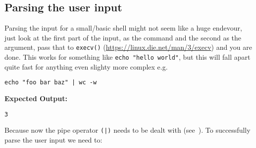 \documentclass[12pt,english]{article}
\newcommand{\funcname}[1]{\texttt{#1()}\xspace} %
\begin{document}
\subsection{Parsing the user input}
Parsing the input for a small/basic shell might not seem like
a huge endevour, just look at the first part of the input, as the command
and the second as the argument, pass that to \funcname{execv}
(\url{https://linux.die.net/man/3/execv}) and you are done. This works for something like \texttt{echo "hello world"},
but this will fall apart quite fast for anything even slighty more complex e.g.
\begin{verbatim}
echo "foo bar baz" | wc -w
\end{verbatim}
\textbf{Expected Output:}
\begin{verbatim}
3
\end{verbatim}
Because now the pipe operator \texttt{(|)} needs to be dealt with (see~).
To successfully parse the user input we need to:

\end{document}
